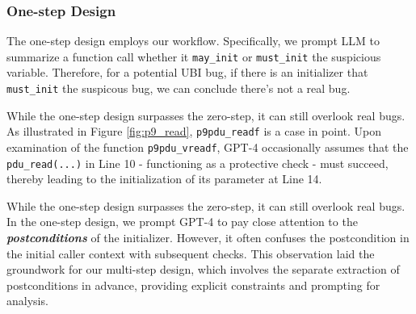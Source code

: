 {\subsubsection{One-step Design}
The one-step design employs our workflow. Specifically, we prompt LLM to summarize a function call whether it \texttt{may\_init} or \texttt{must\_init} the suspicious variable. Therefore, for a potential UBI bug, if there is an initializer that \texttt{must\_init} the suspicous bug, we can conclude there's not a real bug.

While the one-step design surpasses the zero-step, it can still overlook real bugs. As illustrated in Figure \ref{fig:p9_read}, \texttt{p9pdu\_readf} is a case in point. Upon examination of the function \texttt{p9pdu\_vreadf}, GPT-4 occasionally assumes that the \texttt{pdu\_read(...)} in Line 10 - functioning as a protective check - must succeed, thereby leading to the initialization of its parameter at Line 14.
 

While the one-step design surpasses the zero-step, it can still overlook real bugs. In the one-step design, we prompt GPT-4 to pay close attention to the \textbf{\textit{postconditions}} of the initializer. However, it often confuses the postcondition in the initial caller context with subsequent checks. This observation laid the groundwork for our multi-step design, which involves the separate extraction of postconditions in advance, providing explicit constraints and prompting for analysis.
}



